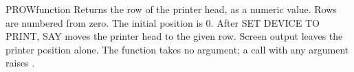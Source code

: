 \begin{XbaseEntry}{PROW}{function}
Returns the row of the printer head, as a numeric value.
\Syntax
{}
\Usage
Rows are numbered from zero.  The initial position is 0.  After
SET DEVICE TO PRINT,  SAY moves the printer head to the given row.
Screen output leaves the printer position alone.
The function takes no argument; a call with any argument raises
.
\Examples
{}
\end{XbaseEntry}
